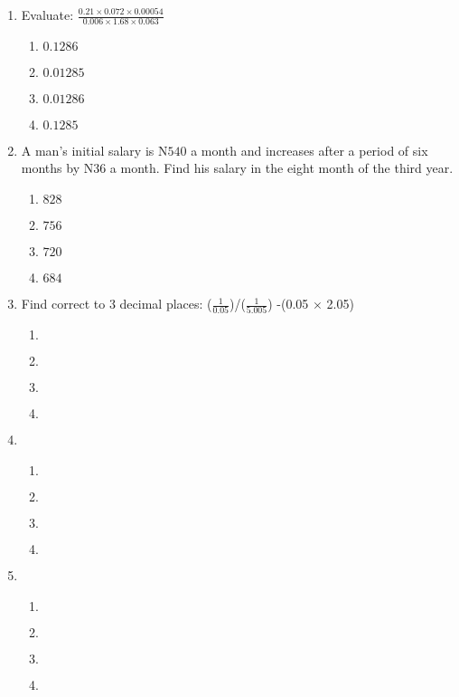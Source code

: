 \begin{multicols}{2}
\begin{enumerate}[label={\arabic*.}]
\begin{enumerate}[label={\Alph*.}]
    \end{enumerate}
\item Evaluate: \(\frac{0.21 \times 0.072 \times 0.00054}{0.006 \times 1.68 \times 0.063}\)
    \begin{enumerate}[label={\Alph*.}]
    \item \(0.1286\)
    \item \(0.01285\)
    \item \(0.01286\)
    \item \(0.1285\)

    \end{enumerate}
\item A man's initial salary is N\(540\) a month and increases after a period of six months by N36 a
month. Find his salary in the eight month of the third year. 
    \begin{enumerate}[label={\Alph*.}]
    \item \(828\)
    \item \(756\)
    \item \(720\)
    \item \(684\)

    \end{enumerate}
\item Find correct to 3 decimal places: (\(\frac{1}{0.05}\))/(\(\frac{1}{5.005}\)) -(0.05 \(\times\) 2.05)
    \begin{enumerate}[label={\Alph*.}]
    \item \(\)
    \item \(\)
    \item \(\)
    \item \(\)

    \end{enumerate}
\item 
    \begin{enumerate}[label={\Alph*.}]
    \item \(\)
    \item \(\)
    \item \(\)
    \item \(\)

    \end{enumerate}
\item 
    \begin{enumerate}[label={\Alph*.}]
    \item \(\)
    \item \(\)
    \item \(\)
    \item \(\)


\end{enumerate}
\end{enumerate}
\end{multicols}
